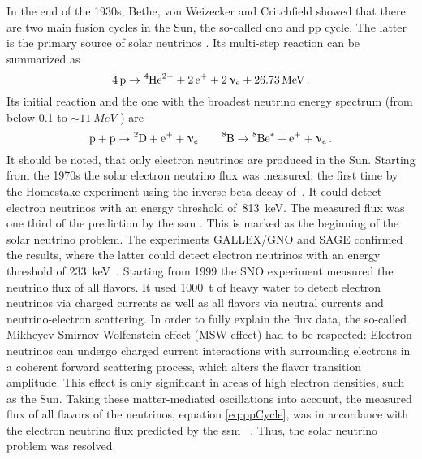 In the end of the 1930s, Bethe, von Weizecker and Critchfield showed that there are two main fusion cycles in the Sun, the so-called cno and pp cycle. The latter is the primary source of solar neutrinos \cite{Weiz1938, Bethe38, Bethe39}. Its multi-step reaction can be summarized as~\cite{zuber2011neutrino}
\begin{equation}
	\ce{4p} 
	\rightarrow 
	\ce{^4He^{2+}} +
	\ce{2e^+} +
	\ce{2\eneutrino} +
	\SI{26.73}{MeV}
	\fullstop
\end{equation}
Its initial reaction and the one with the broadest neutrino energy spectrum (from below 0.1 to $\sim\SI{11}{MeV}$ \cite{ReviewOfParticlePhysics}) are
\begin{equation}
\ce{p} + \ce{p} \rightarrow \ce{^2D} + \ce{e^+} + \upnu_e
\qquad
\ce{^8B} \rightarrow \ce{^8Be^*} + \ce{e^+} + \upnu_e \fullstop
\label{eq:ppCycle}
\end{equation}
It should be noted, that only electron neutrinos are produced in the Sun. Starting from the 1970s the solar electron neutrino flux was measured; the first time by the Homestake experiment using the inverse beta decay of~. It could detect electron neutrinos with an energy threshold of~\SI{813}{keV}. The measured flux was one third of the prediction by the \gls{ssm} \cite{Cleveland1998, Bahcall2001}. This is marked as the beginning of the solar neutrino problem. The experiments GALLEX/GNO and SAGE confirmed the results, where the latter could detect electron neutrinos with an energy threshold of \SI{233}{keV}~\cite{Kirsten1998, Altmann2005, Abdurashitov2009}. Starting from 1999 the SNO experiment measured the neutrino flux of all flavors. It used \SI{1000}{t} of heavy water  to detect electron neutrinos via charged currents as well as all flavors via neutral currents and neutrino-electron scattering. In order to fully explain the flux data, the so-called Mikheyev-Smirnov-Wolfenstein effect (MSW effect) had to be respected: Electron neutrinos can undergo charged current interactions with surrounding electrons in a coherent forward scattering process, which alters the flavor transition amplitude. This effect is only significant in areas of high electron densities, such as the Sun. Taking these matter-mediated oscillations into account, the measured flux of all flavors of the  neutrinos, equation \eqref{eq:ppCycle}, was in accordance with the electron neutrino flux predicted by the \gls{ssm}~ \cite{Aharmim2013}. Thus, the solar neutrino problem was resolved.

